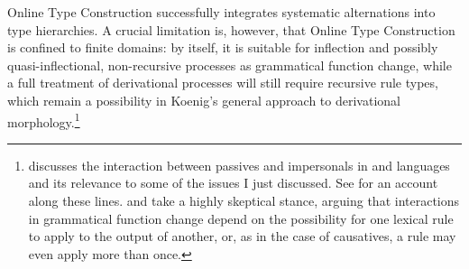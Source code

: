 \documentclass[output=paper
	        ,collection
	        ,collectionchapter
 	        ,biblatex
                ,babelshorthands
                ,newtxmath
                ,draftmode
                ,colorlinks, citecolor=brown
]{langscibook}
\begin{document}
Online Type Construction successfully integrates systematic
alternations into type hierarchies. A crucial limitation is, however,
that Online Type Construction is confined to finite domains: by itself, it is suitable for
inflection and possibly quasi-inflectional, non-recursive processes as
grammatical function change, while a full treatment of derivational
processes will still require recursive rule types, which remain a
possibility in Koenig's general approach to derivational
morphology.\footnote{\citet{Blevins2003a} discusses the interaction
  between passives and impersonals in  and  languages and
  its relevance to some of the issues I just discussed. See
  \citet{ASU99a-u} for an account along these lines.   and  take a
  highly skeptical stance, arguing that interactions in grammatical
  function change depend on the possibility for one lexical rule to
  apply to the output of another, or, as in the case of 
  causatives, a rule may even apply more than
  once.}
\end{document}
